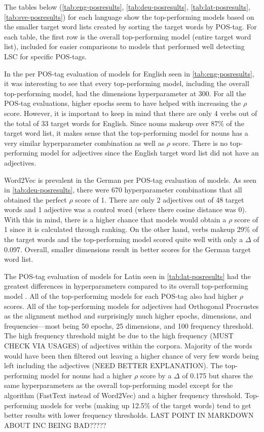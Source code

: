 The tables below (\autoref{tab:eng-posresults}, \autoref{tab:deu-posresults}, \autoref{tab:lat-posresults}, \autoref{tab:sve-posresults}) for each language show the top-performing models based on the smaller target word lists created by sorting the target words by POS-tag. For each table, the first row is the overall top-performing model (entire target word list), included for easier comparisons to models that performed well detecting LSC for specific POS-tags. 

In the per POS-tag evaluation of models for English seen in \autoref{tab:eng-posresults}, it was interesting to see that every top-performing model, including the overall top-performing model, had the dimensions hyperparameter at 300. For all the POS-tag evaluations, higher epochs seem to have helped with increasing the $\rho$ score. However, it is important to keep in mind that there are only 4 verbs out of the total of 33 target words for English. Since nouns makeup over 87\% of the target word list, it makes sense that the top-performing model for nouns has a very similar hyperparameter combination as well as $\rho$ score. There is no top-performing model for adjectives since the English target word list did not have an adjectives. 


Word2Vec is prevalent in the German per POS-tag evaluation of models. As seen in \autoref{tab:deu-posresults}, there were 670 hyperparameter combinations that all obtained the perfect $\rho$ score of 1. There are only 2 adjectives out of 48 target words and 1 adjective was a control word (where there cosine distance was 0). With this in mind, there is a higher chance that models would obtain a $\rho$ score of 1 since it is calculated through ranking. On the other hand, verbs makeup 29\% of the target words and the top-performing model scored quite well with only a $\Delta$ of 0.097. Overall, smaller dimensions result in better scores for the German target word list. 


The POS-tag evaluation of models for Latin seen in \autoref{tab:lat-posresults} had the greatest differences in hyperparameters compared to its overall top-performing model . All of the top-performing models for each POS-tag also had higher $\rho$ scores. All of the top-performing models for adjectives had Orthogonal Procrustes as the alignment method and surprisingly much higher epochs, dimensions, and frequencies—most being 50 epochs, 25 dimensions, and 100 frequency threshold. The high frequency threshold might be due to the high frequency (MUST CHECK VIA USAGES) of adjectives within the corpora. Majority of the words would have been then filtered out leaving a higher chance of very few words being left including the adjectives (NEED BETTER EXPLANATION). The top-performing model for nouns had a higher $\rho$ score by a $\Delta$ of 0.175 but shares the same hyperparameters as the overall top-performing model except for the algorithm (FastText instead of Word2Vec) and a higher frequency threshold. Top-performing models for verbs (making up 12.5\% of the target words) tend to get better results with lower frequency thresholds. LAST POINT IN MARKDOWN ABOUT INC BEING BAD?????


